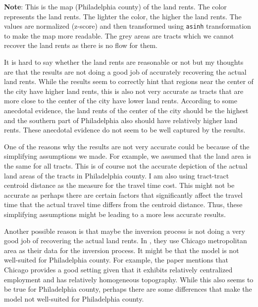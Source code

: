 \documentclass[
  11pt]{article}
\begin{document}
\footnotesize \textbf{Note}: This is the map (Philadelphia county) of
the land rents. The color represents the land rents. The lighter the
color, the higher the land rents. The values are normalized (z-score)
and then transformed using \texttt{asinh} transformation to make the map
more readable. The grey areas are tracts which we cannot recover the
land rents as there is no flow for them.\vspace{2em}

\normalsize

It is hard to say whether the land rents are reasonable or not but my
thoughts are that the results are not doing a good job of accurately
recovering the actual land rents. While the results seem to correctly
hint that regions near the center of the city have higher land rents,
this is also not very accurate as tracts that are more close to the
center of the city have lower land rents. According to some anecdotal
evidence, the land rents of the center of the city should be the highest
and the southern part of Philadelphia also should have relatively higher
land rents. These anecdotal evidence do not seem to be well captured by
the results.

One of the reasons why the results are not very accurate could be
because of the simplifying assumptions we made. For example, we assumed
that the land area is the same for all tracts. This is of course not the
accurate depiction of the actual land areas of the tracts in
Philadelphia county. I am also using tract-tract centroid distance as
the measure for the travel time cost. This might not be accurate as
perhaps there are certain factors that significantly affect the travel
time that the actual travel time differs from the centroid distance.
Thus, these simplifying assumptions might be leading to a more less
accurate results.

Another possible reason is that maybe the inversion process is not doing
a very good job of recovering the actual land rents. In
\citet{brinkman2024}, they use Chicago metropolitan area as their data
for the inversion process. It might be that the model is not well-suited
for Philadelphia county. For example, the paper mentions that Chicago
provides a good setting given that it exhibits relatively centralized
employment and has relatively homogeneous topography. While this also
seems to be true for Philadelphia county, perhaps there are some
differences that make the model not well-suited for Philadelphia county.

\clearpage
\end{document}
